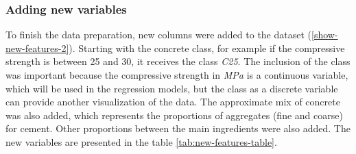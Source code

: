 \documentclass[]{article}
\begin{document}
\hypertarget{adding-new-variables}{%
\subsubsection{Adding new variables}\label{adding-new-variables}}

To finish the data preparation, new columns were added to the dataset
(\ref{show-new-features-2}). Starting with the concrete class, for
example if the compressive strength is between 25 and 30, it receives
the class \emph{C25}. The inclusion of the class was important because
the compressive strength in \emph{MPa} is a continuous variable, which
will be used in the regression models, but the class as a discrete
variable can provide another visualization of the data. The approximate
mix of concrete was also added, which represents the proportions of
aggregates (fine and coarse) for cement. Other proportions between the
main ingredients were also added. The new variables are presented in the
table \ref{tab:new-features-table}.

\begin{table}[H]

\caption{\label{tab:new-features-table}New features}
\centering
{}
\end{table}
\end{document}
